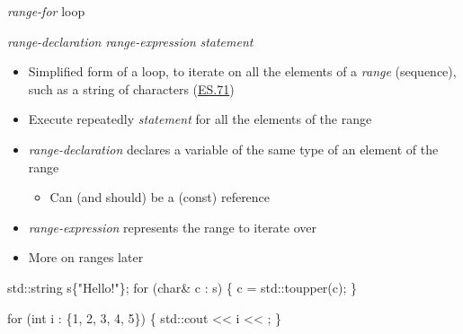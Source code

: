 \begin{frame}[fragile]{\textit{range-for} loop}

     \textit{range-declaration} \code{:} \textit{range-expression} \code{)} \textit{statement}

  \begin{itemize}
  \item Simplified form of a  loop, to iterate on all the elements of
    a \textit{range} (sequence), such as a string of characters (\href{https://isocpp.github.io/CppCoreGuidelines/CppCoreGuidelines#es71-prefer-a-range-for-statement-to-a-for-statement-when-there-is-a-choice}{ES.71})
  \item<2-> Execute repeatedly \textit{statement} for all the elements of the range
  \item<3-> \textit{range-declaration} declares a variable of the same type of
    an element of the range
    \begin{itemize}
    \item Can (and should) be a (const) reference
    \end{itemize}
  \item<4-> \textit{range-expression} represents the range to iterate over
  \item<5-> More on ranges later
  \end{itemize}

  \begin{codeblock}
std::string s\{"Hello!"\};
for (char& c : s) \{
  c = std::toupper(c); 
\}

for (int i : \{1, 2, 3, 4, 5\}) \{
  std::cout << i << \upquote{ };
\}\end{codeblock}

\end{frame}

